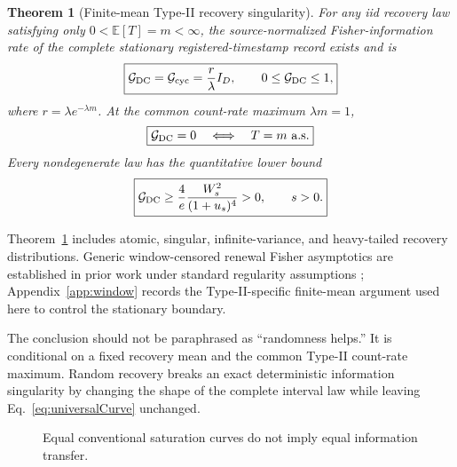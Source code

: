 \documentclass[aps,prapplied,preprint,nofootinbib]{revtex4-2}
\newtheorem{theorem}{Theorem}
\newcommand{\GDC}{\mathcal G_{\rm DC}}
\newcommand{\Gcyc}{\mathcal G_{\rm cyc}}
\newcommand{\E}{\mathbb E}
\begin{document}
\begin{theorem}[Finite-mean Type-II recovery singularity]
\label{thm:recoverySingularity}
For any iid recovery law satisfying only $0<\E[T]=m<\infty$, the source-normalized Fisher-information rate of the complete stationary registered-timestamp record exists and is
\begin{equation}
\boxed{
\GDC=\Gcyc=\frac{r}{\lambda}I_D,
\qquad
0\le\GDC\le1,
}
\label{eq:windowEquality}
\end{equation}
where $r=\lambda e^{-\lambda m}$. At the common count-rate maximum $\lambda m=1$,
\begin{equation}
\boxed{
\GDC=0
\quad\Longleftrightarrow\quad
T=m\ \text{a.s.}
}
\label{eq:zeroIffDet}
\end{equation}
Every nondegenerate law has the quantitative lower bound
\begin{equation}
\boxed{
\GDC
\ge
\frac{4}{e}\frac{W_s^2}{(1+u_s)^4}
>0,
\qquad s>0.
}
\label{eq:WsLower}
\end{equation}
\end{theorem}

Theorem~\ref{thm:recoverySingularity} includes atomic, singular, infinite-variance, and heavy-tailed recovery distributions. Generic window-censored renewal Fisher asymptotics are established in prior work under standard regularity assumptions \cite{ZhaoNagaraja2011}; Appendix~\ref{app:window} records the Type-II-specific finite-mean argument used here to control the stationary boundary.

The conclusion should not be paraphrased as ``randomness helps.'' It is conditional on a fixed recovery mean and the common Type-II count-rate maximum. Random recovery breaks an exact deterministic information singularity by changing the shape of the complete interval law while leaving Eq.~\eqref{eq:universalCurve} unchanged.

\begin{figure}[t]
\centering
{}
\caption{Equal conventional saturation curves do not imply equal information transfer.}
\label{fig:sameCurve}
\end{figure}
\end{document}
